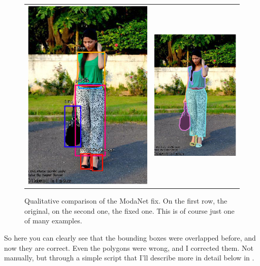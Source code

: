 \begin{figure}[H]
\begin{tabular}{cc}
		\includegraphics[width=.5\textwidth]{./figures/modanetfix/0892135_} & 
		\includegraphics[width=.5\textwidth]{./figures/modanetfix/0892135_c}\\
		
	\end{tabular}
	\caption{Qualitative comparison of the ModaNet fix. On the first row, the original, on the second one, the fixed one. This is of course just one of many examples.}
	\label{f:modanet-fix} %
\end{figure}

So here you can clearly see that the bounding boxes were overlapped before, and now they are correct. Even the polygons were wrong, and I corrected them. Not manually, but through a simple script that I'll describe more in detail below in .

